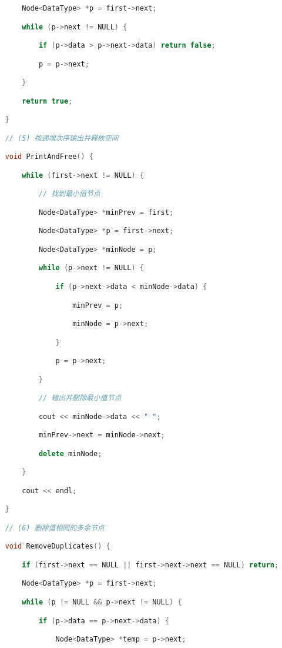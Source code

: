 \begin{lstlisting}[language=C++]
        Node<DataType> *p = first->next;

        while (p->next != NULL) {

            if (p->data > p->next->data) return false;

            p = p->next;

        }

        return true;

    }

    // (5) 按递增次序输出并释放空间

    void PrintAndFree() {

        while (first->next != NULL) {

            // 找到最小值节点

            Node<DataType> *minPrev = first;

            Node<DataType> *p = first->next;

            Node<DataType> *minNode = p;

            while (p->next != NULL) {

                if (p->next->data < minNode->data) {

                    minPrev = p;

                    minNode = p->next;

                }

                p = p->next;

            }

            // 输出并删除最小值节点

            cout << minNode->data << " ";

            minPrev->next = minNode->next;

            delete minNode;

        }

        cout << endl;

    }

    // (6) 删除值相同的多余节点

    void RemoveDuplicates() {

        if (first->next == NULL || first->next->next == NULL) return;

        Node<DataType> *p = first->next;

        while (p != NULL && p->next != NULL) {

            if (p->data == p->next->data) {

                Node<DataType> *temp = p->next;


\end{lstlisting}
